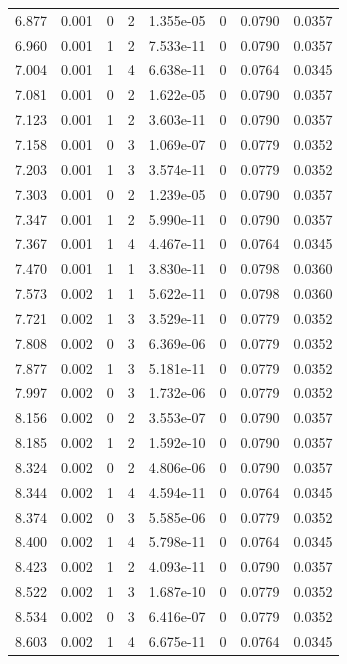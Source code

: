 \documentclass[preview]{standalone}
\begin{document}
{{{\begin{tabular}{L{1.2cm}C{1.2cm} C{0.3cm}C{0.5cm} C{1.4cm}C{1.4cm} C{1.4cm}C{1.4cm}}
  6.877  &  0.001  & 0     &  2 &  1.355e-05  & 0  & 0.0790 &  0.0357   \\ 
  6.960  &  0.001  & 1     &  2 &  7.533e-11  & 0  & 0.0790 &  0.0357   \\ 
  7.004  &  0.001  & 1     &  4 &  6.638e-11  & 0  & 0.0764 &  0.0345   \\ 
  7.081  &  0.001  & 0     &  2 &  1.622e-05  & 0  & 0.0790 &  0.0357   \\ 
  7.123  &  0.001  & 1     &  2 &  3.603e-11  & 0  & 0.0790 &  0.0357   \\ 
  7.158  &  0.001  & 0     &  3 &  1.069e-07  & 0  & 0.0779 &  0.0352   \\ 
  7.203  &  0.001  & 1     &  3 &  3.574e-11  & 0  & 0.0779 &  0.0352   \\ 
  7.303  &  0.001  & 0     &  2 &  1.239e-05  & 0  & 0.0790 &  0.0357   \\ 
  7.347  &  0.001  & 1     &  2 &  5.990e-11  & 0  & 0.0790 &  0.0357   \\ 
  7.367  &  0.001  & 1     &  4 &  4.467e-11  & 0  & 0.0764 &  0.0345   \\ 
  7.470  &  0.001  & 1     &  1 &  3.830e-11  & 0  & 0.0798 &  0.0360   \\ 
  7.573  &  0.002  & 1     &  1 &  5.622e-11  & 0  & 0.0798 &  0.0360   \\ 
  7.721  &  0.002  & 1     &  3 &  3.529e-11  & 0  & 0.0779 &  0.0352   \\ 
  7.808  &  0.002  & 0     &  3 &  6.369e-06  & 0  & 0.0779 &  0.0352   \\ 
  7.877  &  0.002  & 1     &  3 &  5.181e-11  & 0  & 0.0779 &  0.0352   \\ 
  7.997  &  0.002  & 0     &  3 &  1.732e-06  & 0  & 0.0779 &  0.0352   \\ 
  8.156  &  0.002  & 0     &  2 &  3.553e-07  & 0  & 0.0790 &  0.0357   \\ 
  8.185  &  0.002  & 1     &  2 &  1.592e-10  & 0  & 0.0790 &  0.0357   \\ 
  8.324  &  0.002  & 0     &  2 &  4.806e-06  & 0  & 0.0790 &  0.0357   \\ 
  8.344  &  0.002  & 1     &  4 &  4.594e-11  & 0  & 0.0764 &  0.0345   \\ 
  8.374  &  0.002  & 0     &  3 &  5.585e-06  & 0  & 0.0779 &  0.0352   \\ 
  8.400  &  0.002  & 1     &  4 &  5.798e-11  & 0  & 0.0764 &  0.0345   \\ 
  8.423  &  0.002  & 1     &  2 &  4.093e-11  & 0  & 0.0790 &  0.0357   \\ 
  8.522  &  0.002  & 1     &  3 &  1.687e-10  & 0  & 0.0779 &  0.0352   \\ 
  8.534  &  0.002  & 0     &  3 &  6.416e-07  & 0  & 0.0779 &  0.0352   \\ 
  8.603  &  0.002  & 1     &  4 &  6.675e-11  & 0  & 0.0764 &  0.0345   \\ 
\hline 
\end{tabular} 

}}}
\end{document}
